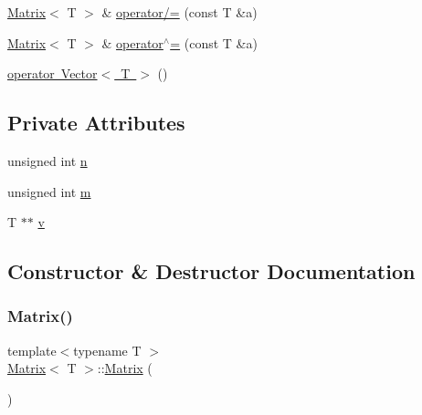 \begin{DoxyCompactItemize}
\item 
\mbox{\hyperlink{classMatrix}{Matrix}}$<$ T $>$ \& \mbox{\hyperlink{classMatrix_ada3039797826038262e03da2ee3a8697_ada3039797826038262e03da2ee3a8697}{operator/=}} (const T \&a)
\item 
\mbox{\hyperlink{classMatrix}{Matrix}}$<$ T $>$ \& \mbox{\hyperlink{classMatrix_af35faeb39342bf42c4470cf10630e32f_af35faeb39342bf42c4470cf10630e32f}{operator$^\wedge$=}} (const T \&a)
\item 
\mbox{\hyperlink{classMatrix_a8d390e8b2581c65774f58a0a3b716dcb_a8d390e8b2581c65774f58a0a3b716dcb}{operator Vector$<$ T $>$}} ()
\end{DoxyCompactItemize}
\subsection*{Private Attributes}
\begin{DoxyCompactItemize}
\item 
unsigned int \mbox{\hyperlink{classMatrix_afe2ef09343ff36b98618d696e7b232e3_afe2ef09343ff36b98618d696e7b232e3}{n}}
\item 
unsigned int \mbox{\hyperlink{classMatrix_a0a922a1712cf7e9afb32fd8fff6809df_a0a922a1712cf7e9afb32fd8fff6809df}{m}}
\item 
T $\ast$$\ast$ \mbox{\hyperlink{classMatrix_a0914658ee459304d3dbcc26806038019_a0914658ee459304d3dbcc26806038019}{v}}
\end{DoxyCompactItemize}


\subsection{Constructor \& Destructor Documentation}
\mbox{\label{classMatrix_a9d567e3a121b1be0c3f9c461cab524fe_a9d567e3a121b1be0c3f9c461cab524fe}} 
\subsubsection{\texorpdfstring{Matrix()}{Matrix()}\hspace{0.1cm}{\footnotesize\ttfamily [1/7]}}
{\footnotesize\ttfamily template$<$typename T $>$ \\
\mbox{\hyperlink{classMatrix}{Matrix}}$<$ T $>$\+::\mbox{\hyperlink{classMatrix}{Matrix}} (\begin{DoxyParamCaption}{ }\end{DoxyParamCaption})}

